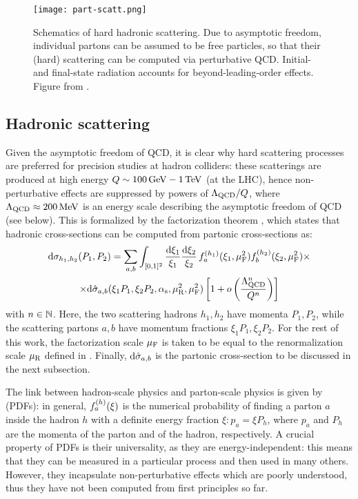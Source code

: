 \begin{figure}
  \centering
  \texttt{[image: part-scatt.png]}
  \caption{Schematics of hard hadronic scattering. Due to asymptotic freedom, individual partons can be assumed to be free particles, so that their (hard) scattering can be computed via perturbative QCD. Initial- and final-state radiation accounts for beyond-leading-order effects. Figure from \cite{Asteriadis-2020}.}
  \label{fig:part-scatt}
\end{figure}

\subsection{Hadronic scattering}

Given the asymptotic freedom of QCD, it is clear why hard scattering processes are preferred for precision studies at hadron colliders: these scatterings are produced at high energy $ Q \sim 100\,\mathrm{GeV} - 1\,\mathrm{TeV} $ (at the LHC), hence non-perturbative effects are suppressed by powers of $ \Lambda_\text{QCD} / Q $, where $ \Lambda_\text{QCD} \approx 200\,\mathrm{MeV} $ is an energy scale describing the asymptotic freedom of QCD (see below). This is formalized by the factorization theorem \cite{Collins-1989}, which states that hadronic cross-sections can be computed from partonic cross-sections as:
\begin{multline}
  \mathrm{d}\sigma_{h_1,h_2}(P_1 , P_2) = \sum_{a,b} \int_{[0,1]^2} \frac{\mathrm{d} \xi_1}{\xi_1} \frac{\mathrm{d} \xi_2}{\xi_2} \, f_{a}^{(h_1)}(\xi_1, \mu_\text{F}^2) f_{b}^{(h_2)}(\xi_2, \mu_\text{F}^2) \times \\
  \times \mathrm{d}\hat{\sigma}_{a,b}(\xi_1 P_1, \xi_2 P_2, \alpha_\text{s}, \mu_\text{R}^2, \mu_\text{F}^2)
  \left[ 1 + o \left( \frac{\Lambda_\text{QCD}^n}{Q^n} \right) \right]
  \label{eq:fact-th}
\end{multline}
with $ n \in \mathbb{N} $. Here, the two scattering hadrons $ h_1 , h_2 $ have momenta $ P_1 , P_2 $, while the scattering partons $ a , b $ have momentum fractions $ \xi_1 P_1 , \xi_2 P_2 $. For the rest of this work, the factorization scale $ \mu_\text{F} $ is taken to be equal to the renormalization scale $ \mu_\text{R} $ defined in . Finally, $ \mathrm{d}\hat{\sigma}_{a,b} $ is the partonic cross-section to be discussed in the next subsection.

The link between hadron-scale physics and parton-scale physics is given by  (PDFs): in general, $ f_{a}^{(h)}(\xi) $ is the numerical probability of finding a parton $ a $ inside the hadron $ h $ with a definite energy fraction $ \xi : p_a = \xi P_h $, where $ p_a $ and $ P_h $ are the momenta of the parton and of the hadron, respectively. A crucial property of PDFs is their universality, as they are energy-independent: this means that they can be measured in a particular process and then used in many others. However, they incapsulate non-perturbative effects which are poorly understood, thus they have not been computed from first principles so far.

